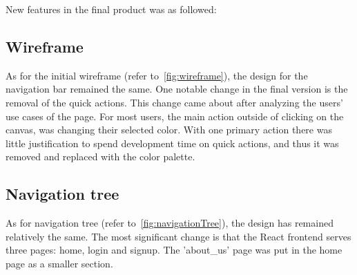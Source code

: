 New features in the final product was as followed:

\begin{table}[!h]
    \caption{New features in final product}
    \label{tab:newFeatures}
\end{table}

\subsection{Wireframe}\label{subsec:wireframe2}
As for the initial wireframe (refer to~\ref{fig:wireframe}), the design for the navigation bar remained the same.
One notable change in the final version is the removal of the quick actions.
This change came about after analyzing the users' use cases of the page.
For most users, the main action outside of clicking on the canvas, was changing their selected color.
With one primary action there was little justification to spend development time on quick actions, and thus it was removed and replaced with the color palette.

\subsection{Navigation tree}\label{subsec:navigation-tree2}
As for navigation tree (refer to~\ref{fig:navigationTree}), the design has remained relatively the same.
The most significant change is that the React frontend serves three pages: home, login and signup.
The 'about\_us' page was put in the home page as a smaller section.

